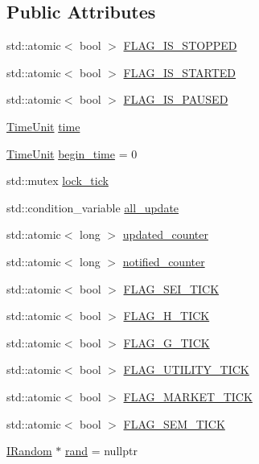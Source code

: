 \subsection*{Public Attributes}
{\bf }\par
\begin{DoxyCompactItemize}
\item 
std\+::atomic$<$ bool $>$ \hyperlink{classsolar__core_1_1_w_a9bb998c65a7427961de179f41e25daea}{F\+L\+A\+G\+\_\+\+I\+S\+\_\+\+S\+T\+O\+P\+P\+E\+D}
\item 
std\+::atomic$<$ bool $>$ \hyperlink{classsolar__core_1_1_w_a8456f88d45f2e8bf67eccd7f0c8d08fa}{F\+L\+A\+G\+\_\+\+I\+S\+\_\+\+S\+T\+A\+R\+T\+E\+D}
\item 
std\+::atomic$<$ bool $>$ \hyperlink{classsolar__core_1_1_w_a1c0ebdba727a7a5cbf322072ab5c9184}{F\+L\+A\+G\+\_\+\+I\+S\+\_\+\+P\+A\+U\+S\+E\+D}
\item 
\hyperlink{namespacesolar__core_a4b5949d07259da6f8a20d12a30403e90}{Time\+Unit} \hyperlink{classsolar__core_1_1_w_ae96b30122adc9fae8fc2f209a4c89b0a}{time}
\item 
\hyperlink{namespacesolar__core_a4b5949d07259da6f8a20d12a30403e90}{Time\+Unit} \hyperlink{classsolar__core_1_1_w_aec1b9014ad296dc9b8b132ba9b67c08a}{begin\+\_\+time} = 0
\item 
std\+::mutex \hyperlink{classsolar__core_1_1_w_a56ba20ee51f5db7288e55bb65f12511b}{lock\+\_\+tick}
\item 
std\+::condition\+\_\+variable \hyperlink{classsolar__core_1_1_w_aa6cba0dba8a566978e51fb4204aac4b9}{all\+\_\+update}
\item 
std\+::atomic$<$ long $>$ \hyperlink{classsolar__core_1_1_w_a775d817c6117b462571c3fca62fe0c86}{updated\+\_\+counter}
\item 
std\+::atomic$<$ long $>$ \hyperlink{classsolar__core_1_1_w_afee32d515534826a60ddf12936f85a3d}{notified\+\_\+counter}
\item 
std\+::atomic$<$ bool $>$ \hyperlink{classsolar__core_1_1_w_a65d2047e574ed6201a8e21ec1ba1bec4}{F\+L\+A\+G\+\_\+\+S\+E\+I\+\_\+\+T\+I\+C\+K}
\item 
std\+::atomic$<$ bool $>$ \hyperlink{classsolar__core_1_1_w_a4cd32940e21bfc20919cc2d4447d66d3}{F\+L\+A\+G\+\_\+\+H\+\_\+\+T\+I\+C\+K}
\item 
std\+::atomic$<$ bool $>$ \hyperlink{classsolar__core_1_1_w_aae63ce0d440f2c8d475d6eeafac58238}{F\+L\+A\+G\+\_\+\+G\+\_\+\+T\+I\+C\+K}
\item 
std\+::atomic$<$ bool $>$ \hyperlink{classsolar__core_1_1_w_adeb9d0fefdb9b63c8e28d93fcff34468}{F\+L\+A\+G\+\_\+\+U\+T\+I\+L\+I\+T\+Y\+\_\+\+T\+I\+C\+K}
\item 
std\+::atomic$<$ bool $>$ \hyperlink{classsolar__core_1_1_w_a7aa8b882244539e098e45207045d7d88}{F\+L\+A\+G\+\_\+\+M\+A\+R\+K\+E\+T\+\_\+\+T\+I\+C\+K}
\item 
std\+::atomic$<$ bool $>$ \hyperlink{classsolar__core_1_1_w_ae383b7a595cb28d52aa747fc7e5bb619}{F\+L\+A\+G\+\_\+\+S\+E\+M\+\_\+\+T\+I\+C\+K}
\item 
\hyperlink{classsolar__core_1_1_i_random}{I\+Random} $\ast$ \hyperlink{classsolar__core_1_1_w_aa60afb55012cd72e304ac2c133e5a245}{rand} = nullptr
\end{DoxyCompactItemize}

